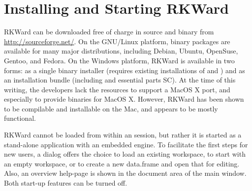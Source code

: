 \section{Installing and Starting RKWard}
\label{sec:installing_starting_RKWard}
RKWard can be downloaded free of charge in source and binary from
\url{http://sourceforge.net/}. On the GNU/Linux
platform, binary packages are available for many major distributions,
including Debian, Ubuntu, OpenSuse, Gentoo, and Fedora. On the Windows
platform, RKWard is available in two forms: as a single binary
installer (requires existing installations of
 and ) and
as an installation bundle (including  and
essential parts  SC). At the time of
this writing, the developers lack the resources to support a MacOS X
port, and especially to provide binaries for MacOS X. However, RKWard
has been shown to be compilable and installable on the Mac, and appears
to be mostly functional.

RKWard cannot be loaded from within an 
session, but rather it is started as a stand-alone application with an
embedded  engine. To facilitate the first
steps for new users, a dialog offers the choice to load an existing
workspace, to start with an empty workspace, or to create a new
data.frame and open that for editing. Also, an overview help-page is
shown in the document area of the main window. Both start-up features
can be turned off.